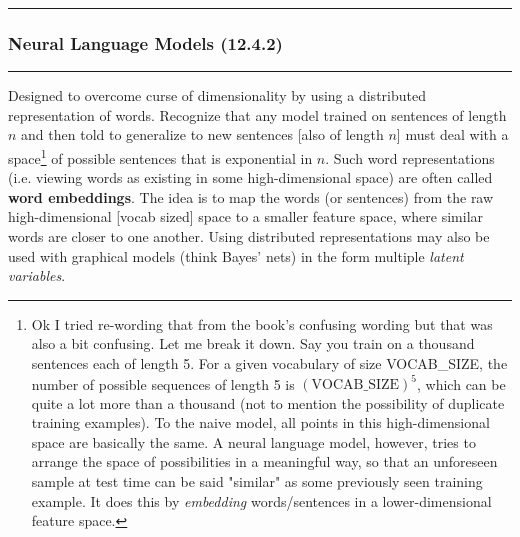 \documentclass[11pt]{article}
\newcommand\p{\Needspace{10\baselineskip} \noindent}
\newcommand\subsub[1]{\Needspace{15\baselineskip}\hrule\subsubsection{#1}\hrule}
\begin{document}
\subsub{Neural Language Models (12.4.2)}

\p Designed to overcome curse of dimensionality by using a distributed representation of words. Recognize that any model trained on sentences of length $n$ and then told to generalize to new sentences [also of length $n$] must deal with a space\footnote{Ok I tried re-wording that from the book's confusing wording but that was also a bit confusing. Let me break it down. Say you train on a thousand sentences each of length 5. For a given vocabulary of size VOCAB\_SIZE, the number of possible sequences of length 5 is $(\text{VOCAB\_SIZE})^5$, which can be quite a lot more than a thousand (not to mention the possibility of duplicate training examples). To the naive model, all points in this high-dimensional space are basically the same. A neural language model, however, tries to arrange the space of possibilities in a meaningful way, so that an unforeseen sample at test time can be said "similar" as some previously seen training example. It does this by \textit{embedding} words/sentences in a lower-dimensional feature space.} of possible sentences that is exponential in $n$. Such word representations (i.e. viewing words as existing in some high-dimensional space) are often called \textbf{word embeddings}. The idea is to map the words (or sentences) from the raw high-dimensional [vocab sized] space to a smaller feature space, where similar words are closer to one another. Using distributed representations may also be used with graphical models (think Bayes' nets) in the form multiple \textit{latent variables}. 










\label{Deep Learning Research}

\end{document}
